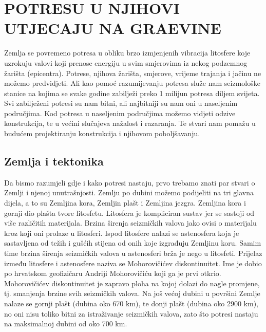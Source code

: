 \documentclass[12pt]{book}
\begin{document}
\chapter{\uppercase{Potresu u njihovi utjecaju na gra{\DJ}evine}}
Zemlja se povremeno potresa u obliku brzo izmjenjenih vibracija litosfere koje uzrokuju valovi koji prenose energiju u svim smjerovima iz nekog podzemnog žarišta (epicentra). Potrese, njihova žarišta, smjerove, vrijeme trajanja i jačinu ne možemo predvidjeti. Ali kao pomoć razumijevanju potresa služe nam seizmološke stanice na kojima se svake godine zabilježi preko 1 milijun potresa diljem svijeta. Svi zabilježeni potresi su nam bitni, ali najbitniji su nam oni u naseljenim područjima. Kod potresa u naseljenim područjima možemo vidjeti odzive konstrukcija, te u većini slučajeva nažalost i razaranja. Te stvari nam pomažu u budućem projektiranju konstrukcija i njihovom poboljšavanju. \cite{herak1984}

\section{Zemlja i tektonika}

Da bismo razumjeli gdje i kako potresi nastaju, prvo trebamo znati par stvari o Zemlji i njenoj unutrašnjosti. Zemlju po dubini možemo podijeliti na tri glavna dijela, a to su Zemljina kora, Zemljin plašt i Zemljina jezgra. Zemljina kora i gornji dio plašta tvore litosfetu. Litosfera je kompliciran sustav jer se sastoji od više različitih materijala. Brzina širenja seizmičkih valova jako ovisi o materijalu kroz koji oni prolaze u litosferi. Ispod litosfere nalazi se astenosfera koja je sastavljena od težih i gušćih stijena od onih koje izgrađuju Zemljinu koru. Samim time brzina širenja seizmičkih valova u astenosferi brža je nego u litosfeti. Prijelaz između litosfere i astenosfere naziva se Mohorovičićev diskontinuitet. Ime je dobio po hrvatskom geofizičaru Andriji Mohorovičiću koji ga je prvi otkrio. Mohorovičićev diskontinuitet je zapravo ploha na kojoj dolazi do nagle promjene, tj. smanjenja brzine svih seizmičkih valova.
Na još većoj dubini u površini Zemlje nalaze se gornji plašt (dubina oko 670 km), te donji plašt (dubina oko 2900 km), no oni nisu toliko bitni za istraživanje seizmičkih valova, zato što potresi nastaju na maksimalnoj dubini od oko 700 km. \cite{herak1984} \cite{oluic2015}
 
\end{document}
